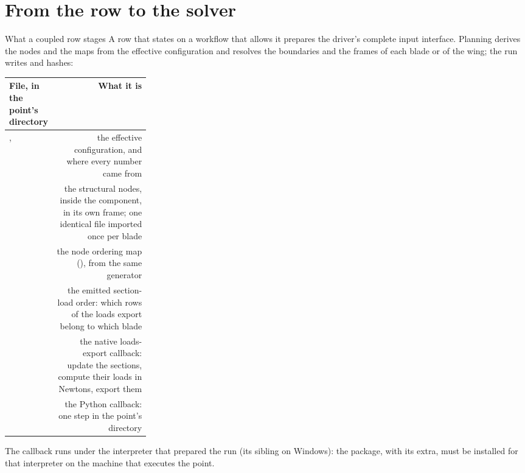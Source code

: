 %

\section{From the row to the solver}

\begin{frame}{What a coupled row stages}
\small A row that states  on a workflow that allows it
prepares the driver's complete input interface. Planning derives the nodes
and the maps from the effective configuration and resolves the boundaries and
the frames of each blade or of the wing; the run writes and hashes:
\par\vspace{1.5mm}
{\ftstablesize\renewcommand{\arraystretch}{1.15}
\begin{tabularx}{\linewidth}{@{}P{0.27\linewidth}R@{}}
\toprule
\textbf{File, in the point's directory} & \textbf{What it is} \\
\midrule
{},  & the effective configuration, and where every number came from \\
 & the structural nodes, inside the component, in its own frame; one identical file imported once per blade \\
 & the node ordering map (), from the same generator \\
 & the emitted section-load order: which rows of the loads export belong to which blade \\
 & the native loads-export callback: update the sections, compute their loads in Newtons, export them \\
 & the Python callback: one  step in the point's directory \\
\bottomrule
\end{tabularx}}
\par\vspace{1.5mm}
{\scriptsize The callback runs under the interpreter that prepared the run
(its  sibling on Windows): the package, with its
\code{[fsi]} extra, must be installed for that interpreter on the machine
that executes the point.\par}
\end{frame}

